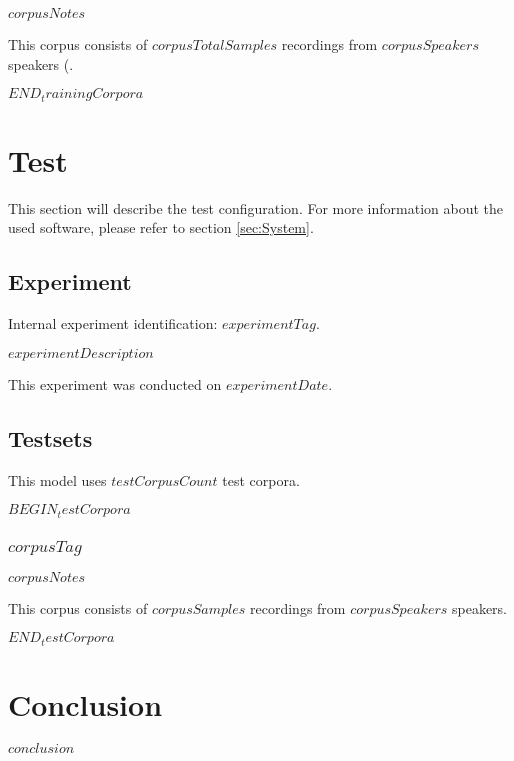 \documentclass[a4paper,10pt,bibtotoc]{scrartcl}
\begin{document}
\begin{multicols}{2}
$corpusNotes$

This corpus consists of $corpusTotalSamples$ recordings from $corpusSpeakers$ speakers (.

$END_trainingCorpora$

\section{Test}

This section will describe the test configuration. For more information about the used software, please refer to section \ref{sec:System}.

\subsection{Experiment}

Internal experiment identification: $experimentTag$.

$experimentDescription$

This experiment was conducted on $experimentDate$.

\subsection{Testsets}

This model uses $testCorpusCount$ test corpora.

$BEGIN_testCorpora$
\subsubsection{$corpusTag$}

$corpusNotes$

This corpus consists of $corpusSamples$ recordings from $corpusSpeakers$ speakers.

$END_testCorpora$


\section{Conclusion}
$conclusion$

\end{multicols}
\end{document}
